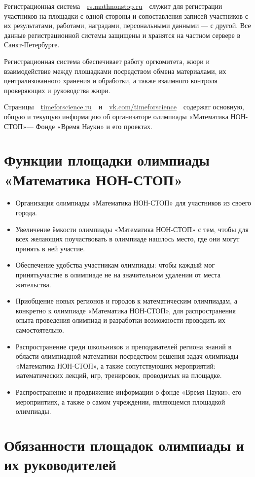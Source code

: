 \documentclass[a4paper,12pt]{article}
\newcommand{\mns}{«Математика НОН-СТОП»\xspace}
\begin{document}
Регистрационная система\ \ \url{rs.mathnonstop.ru}\ \ служит для регистрации участников на площадки с одной стороны и сопоставления записей участников с их результатами, работами, наградами, персональными данными — с другой. Все данные регистрационной системы защищены и хранятся на частном сервере в Санкт-Петербурге.

Регистрационная система обеспечивает работу оргкомитета, жюри и взаимодействие между площадками посредством обмена материалами, их централизованного хранения и обработки, а также взаимного контроля проверяющих и руководства жюри.

Страницы\ \ \url{timeforscience.ru}\ \ и\ \ \url{vk.com/timeforscience}\ \ содержат основную, общую и текущую информацию об организаторе олимпиады \mns — Фонде «Время Науки» и его проектах.

\section{Функции площадки олимпиады \mns}

\begin{itemize}
	\item Организация олимпиады \mns для участников из своего города.
	\item Увеличение ёмкости олимпиады \mns с тем, чтобы для всех желающих поучаствовать в олимпиаде нашлось место, где они могут принять в ней участие.
	\item Обеспечение удобства участникам олимпиады: чтобы каждый мог принять\linebreak участие в олимпиаде не на значительном удалении от места жительства.
	\item Приобщение новых регионов и городов к математическим олимпиадам, а конкретно к олимпиаде \mns, для распространения опыта проведения олимпиад и разработки возможности проводить их самостоятельно.
	\item Распространение среди школьников и преподавателей региона знаний в области олимпиадной математики посредством решения задач олимпиады \mns, а также сопутствующих мероприятий: математических лекций, игр, тренировок, проводимых на площадке.
	\item Распространение и продвижение информации о фонде «Время Науки», его мероприятиях, а также о самом учреждении, являющемся площадкой олимпиады.
\end{itemize}

\section{Обязанности площадок олимпиады и их руководителей}
\end{document}
